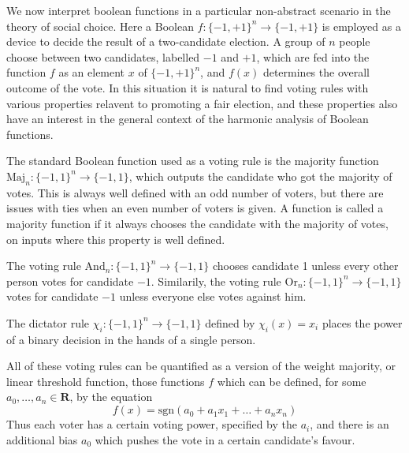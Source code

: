 We now interpret boolean functions in a particular non-abstract scenario in the theory of social choice. Here a Boolean $f: \{ -1, +1 \}^n \to \{ -1, +1 \}$ is employed as a device to decide the result of a two-candidate election. A group of $n$ people choose between two candidates, labelled $-1$ and $+1$, which are fed into the function $f$ as an element $x$ of $\{ -1, +1 \}^n$, and $f(x)$ determines the overall outcome of the vote. In this situation it is natural to find voting rules with various properties relavent to promoting a fair election, and these properties also have an interest in the general context of the harmonic analysis of Boolean functions.

\begin{example}
    The standard Boolean function used as a voting rule is the majority function $\text{Maj}_n: \{ -1, 1 \}^n \to \{ -1, 1 \}$, which outputs the candidate who got the majority of votes. This is always well defined with an odd number of voters, but there are issues with ties when an even number of voters is given. A function is called a majority function if it always chooses the candidate with the majority of votes, on inputs where this property is well defined.
\end{example}

\begin{example}
    The voting rule $\text{And}_n: \{ -1, 1 \}^n \to \{ -1, 1 \}$ chooses candidate 1 unless every other person votes for candidate $-1$. Similarily, the voting rule $\text{Or}_n: \{ -1, 1 \}^n \to \{ -1, 1 \}$ votes for candidate $-1$ unless everyone else votes against him.
\end{example}

\begin{example}
    The dictator rule $\chi_i: \{ -1, 1 \}^n \to \{ -1, 1 \}$ defined by $\chi_i(x) = x_i$ places the power of a binary decision in the hands of a single person.
\end{example}

\begin{example}
    All of these voting rules can be quantified as a version of the weight majority, or linear threshold function, those functions $f$ which can be defined, for some $a_0, \dots, a_n \in \mathbf{R}$, by the equation
    \[ f(x) = \text{sgn}(a_0 + a_1x_1 + \dots + a_nx_n) \]
    Thus each voter has a certain voting power, specified by the $a_i$, and there is an additional bias $a_0$ which pushes the vote in a certain candidate's favour.
\end{example}

